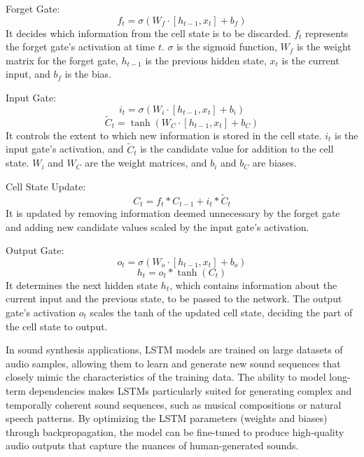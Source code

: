 \documentclass[11pt,a4paper,oneside]{report}
\begin{document}
Forget Gate:
\begin{equation}
f_t = \sigma(W_{f} \cdot [h_{t-1}, x_t] + b_f)
\end{equation}
It decides which information from the cell state is to be discarded. $f_t$ represents the forget gate's activation at time $t$. $\sigma$ is the sigmoid function, $W_{f}$ is the weight matrix for the forget gate, $h_{t-1}$ is the previous hidden state, $x_t$ is the current input, and $b_f$ is the bias.

Input Gate:
\begin{equation}
i_t = \sigma(W_{i} \cdot [h_{t-1}, x_t] + b_i)
\end{equation}
\begin{equation}
\tilde{C}_t = \tanh(W_{C} \cdot [h_{t-1}, x_t] + b_C)
\end{equation}
It controls the extent to which new information is stored in the cell state. $i_t$ is the input gate's activation, and $\tilde{C}_t$ is the candidate value for addition to the cell state. $W_{i}$ and $W_{C}$ are the weight matrices, and $b_i$ and $b_C$ are biases.

Cell State Update:
\begin{equation}
C_t = f_t \ast C_{t-1} + i_t \ast \tilde{C}_t
\end{equation}
It is updated by removing information deemed unnecessary by the forget gate and adding new candidate values scaled by the input gate's activation.

Output Gate:
\begin{equation}
o_t = \sigma(W_{o} \cdot [h_{t-1}, x_t] + b_o)
\end{equation}
\begin{equation}
h_t = o_t \ast \tanh(C_t)
\end{equation}
It determines the next hidden state $h_t$, which contains information about the current input and the previous state, to be passed to the network. The output gate's activation $o_t$ scales the tanh of the updated cell state, deciding the part of the cell state to output.

In sound synthesis applications, LSTM models are trained on large datasets of audio samples, allowing them to learn and generate new sound sequences that closely mimic the characteristics of the training data. The ability to model long-term dependencies makes LSTMs particularly suited for generating complex and temporally coherent sound sequences, such as musical compositions or natural speech patterns. By optimizing the LSTM parameters (weights and biases) through backpropagation, the model can be fine-tuned to produce high-quality audio outputs that capture the nuances of human-generated sounds.
\end{document}
